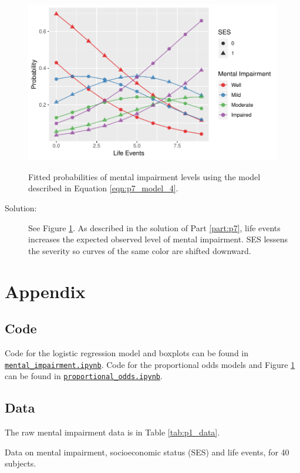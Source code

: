 \documentclass[letterpaper,11pt]{article}
\begin{document}
\begin{enumerate}
  \begin{figure}[h]
    \centering
    \caption{Fitted probabilities of mental impairment levels using the model
      described in Equation \ref{eqn:p7_model_4}.}
    \includegraphics{p8_fitted_probabilities.pdf}
    \label{fig:p8_fitted_probabilities}
  \end{figure}
  
  \begin{description}
  \item[Solution:] See Figure \ref{fig:p8_fitted_probabilities}. As described in
    the solution of Part \ref{part:p7}, life events increases the expected
    observed level of mental impairment. SES lessens the severity so curves of
    the same color are shifted downward.
  \end{description}
\end{enumerate}

\clearpage

\section*{Appendix}

\subsection*{Code}

Code for the logistic regression model and boxplots can be found in
\href{http://nbviewer.jupyter.org/github/ppham27/stat570/blob/master/hw7/mental_impairment.ipynb}{\texttt{mental\_impairment.ipynb}}. Code
for the proportional odds models and Figure \ref{fig:p8_fitted_probabilities}
can be found in
\href{http://nbviewer.jupyter.org/github/ppham27/stat570/blob/master/hw7/proportional\_odds.ipynb}{\texttt{proportional\_odds.ipynb}}.

\subsection*{Data}

The raw mental impairment data is in Table \ref{tab:p1_data}.

\begin{table}[h]
  \scriptsize
  \centering
  
  \caption{Data on mental impairment, socioeconomic status (SES) and life
    events, for 40 subjects.}
  \label{tab:p1_data}
\end{table}
\end{document}
